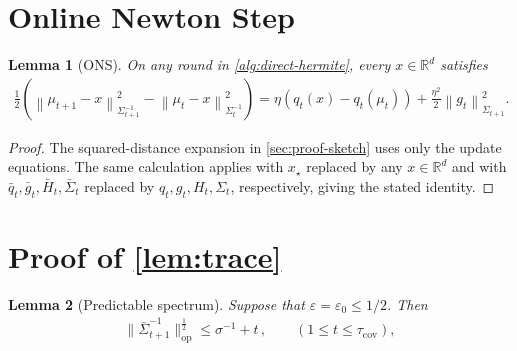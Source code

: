 \documentclass{article}
\newtheorem{lemma}[lemma]{Lemma}
\newcommand{\R}{\mathbb R}
\newcommand{\Lip}{\operatorname{Lip}}
\newcommand{\op}{\mathrm{op}}
\newcommand{\1}{\mathbf 1}
\newcommand{\eps}{\varepsilon}
\newcommand{\normm}[2]{\left\lVert #1\right\rVert_{#2}}
\begin{document}
\section{Online Newton Step}
\label{app:ons}
\begin{lemma}[ONS]
    \label{lem:ons-step}
    On any round in \cref{alg:direct-hermite}, every $x\in\R^d$ satisfies
    \begin{align}
        \frac12
        \left(\normm{\mu_{t+1}-x}{\Sigma_{t+1}^{-1}}^2
        -\normm{\mu_t-x}{\Sigma_t^{-1}}^2\right)
        =
        \eta\left(
        q_t(x)-q_t(\mu_t)
        \right)
        +\frac{\eta^2}{2}\normm{g_t}{\Sigma_{t+1}}^2.
        \label{eq:ons-step}
    \end{align}
\end{lemma}
\begin{proof}
    The squared-distance expansion in \cref{sec:proof-sketch} uses only
    the update equations. The same calculation applies with $x_\star$
    replaced by any $x\in\R^d$ and with
    $\bar{q}_t,\bar{g}_t,\bar{H}_t,\bar{\Sigma}_t$ replaced by
    $q_t,g_t,H_t,\Sigma_t$,
    respectively, giving the stated identity.
\end{proof}

\section{Proof of \cref{lem:trace}}
\label{app:trace}

\begin{lemma}[Predictable spectrum]
    \label{lem:predictable-spectrum}
    Suppose that $\eps=\eps_0\leq1/2$. Then
    \begin{align}
        \|\bar{\Sigma}_{t+1}^{-1}\|_{\op}^{\frac12}
        \leq
        \sigma^{-1}+t\,,
        \qquad(1\leq t\leq \tau_{\mathrm{cov}}),
        \label{eq:predictable-spectrum}
    \end{align}
\end{lemma}
\end{document}
